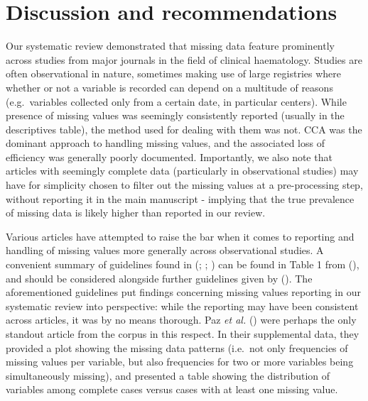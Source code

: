 \documentclass[
  letterpaper,
  paper=240mm:170mm,
  twoside=true,
  open=right,
  fontsize=10pt,
  pagesize=false,
  BCOR=15mm,
  DIV=14,
  headinclude=true,
  footinclude=false,
  headsepline=on]{scrbook}
\begin{document}
\section{Discussion and
recommendations}\label{discussion-and-recommendations}

Our systematic review demonstrated that missing data feature prominently
across studies from major journals in the field of clinical haematology.
Studies are often observational in nature, sometimes making use of large
registries where whether or not a variable is recorded can depend on a
multitude of reasons (e.g.~variables collected only from a certain date,
in particular centers). While presence of missing values was seemingly
consistently reported (usually in the descriptives table), the method
used for dealing with them was not. CCA was the dominant approach to
handling missing values, and the associated loss of efficiency was
generally poorly documented. Importantly, we also note that articles
with seemingly complete data (particularly in observational studies) may
have for simplicity chosen to filter out the missing values at a
pre-processing step, without reporting it in the main manuscript -
implying that the true prevalence of missing data is likely higher than
reported in our review.

Various articles have attempted to raise the bar when it comes to
reporting and handling of missing values more generally across
observational studies. A convenient summary of guidelines found in
(; ;
) can be found in Table 1 from
(),
and should be considered alongside further guidelines given by
(). The aforementioned guidelines put findings concerning missing
values reporting in our systematic review into perspective: while the
reporting may have been consistent across articles, it was by no means
thorough. Paz \emph{et al.}
() were perhaps the
only standout article from the corpus in this respect. In their
supplemental data, they provided a plot showing the missing data
patterns (i.e.~not only frequencies of missing values per variable, but
also frequencies for two or more variables being simultaneously
missing), and presented a table showing the distribution of variables
among complete cases versus cases with at least one missing value.
\end{document}
